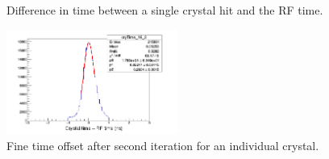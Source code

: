 \documentclass[twoside]{article}
\begin{document}
\begin{multicols}{2}
\begin{figure}[H]
  \caption{Difference in time between a single crystal hit and the RF time.}
  \label{fig:spectra}
\end{figure}
\begin{figure}[H]
  \centering
      \includegraphics[width=0.5\textwidth]{crystalSpectra2.png}
  \caption{Fine time offset after second iteration for an individual crystal.}
    \label{fig:spectra2}
\end{figure}

\end{multicols}
\end{document}
